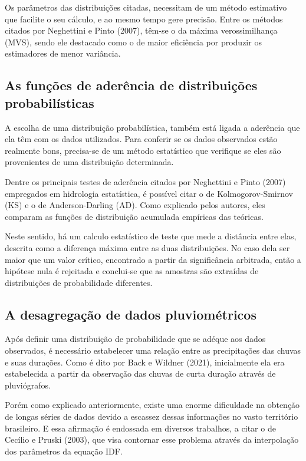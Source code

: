 Os parâmetros das distribuições citadas, necessitam de um método estimativo que facilite o seu cálculo, e ao mesmo tempo gere precisão. Entre os métodos citados por Neghettini e Pinto (2007), têm-se o da máxima verossimilhança (MVS), sendo ele destacado como o de maior eficiência por produzir os estimadores de menor variância.

\subsection{As funções de aderência de distribuições probabilísticas}

A escolha de uma distribuição probabilística, também está ligada a aderência que ela têm com os dados utilizados. Para conferir se os dados observados estão realmente bons, precisa-se de um método estatístico que verifique se eles são provenientes de uma distribuição determinada. 

Dentre os principais testes de aderência citados por Neghettini e Pinto (2007) empregados em hidrologia estatística, é possível citar o de Kolmogorov-Smirnov (KS) e o de Anderson-Darling (AD). Como explicado pelos autores, eles comparam as funções de distribuição acumulada empíricas das teóricas.

Neste sentido, há um calculo estatístico de teste que mede a distância entre elas, descrita como a diferença máxima entre as duas distribuições. No caso dela ser maior que um valor crítico, encontrado a partir da significância arbitrada, então a hipótese nula é rejeitada e conclui-se que as amostras são extraídas de distribuições de probabilidade diferentes.

\subsection{A desagregação de dados pluviométricos}

Após definir uma distribuição de probabilidade que se adéque aos dados observados, é necessário estabelecer uma relação entre as precipitações das chuvas e suas durações. Como é dito por Back e Wildner (2021), inicialmente ela era estabelecida a partir da observação das chuvas de curta duração através de pluviógrafos.

Porém como explicado anteriormente, existe uma enorme dificuldade na obtenção de longas séries de dados devido a escassez dessas informações no vasto território brasileiro. E essa afirmação é endossada em diversos trabalhos, a citar o de Cecílio e Pruski (2003), que visa contornar esse problema através da interpolação dos parâmetros da equação IDF.

